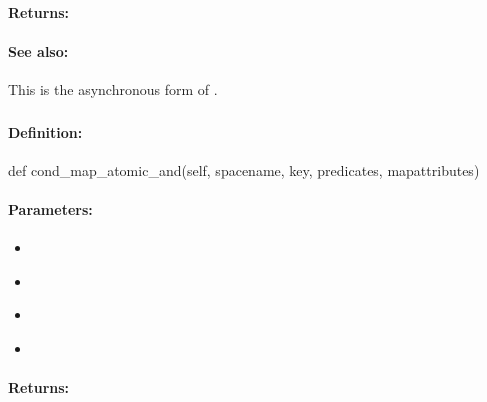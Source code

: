 \paragraph{Returns:}


\paragraph{See also:}  This is the asynchronous form of .

\pagebreak
\subsubsection{}
\label{api:python:cond_map_atomic_and}


\paragraph{Definition:}
\begin{pythoncode}
def cond_map_atomic_and(self, spacename, key, predicates, mapattributes)
\end{pythoncode}

\paragraph{Parameters:}
\begin{itemize}[noitemsep]
\item {}\\

\item {}\\

\item {}\\

\item {}\\

\end{itemize}

\paragraph{Returns:}



